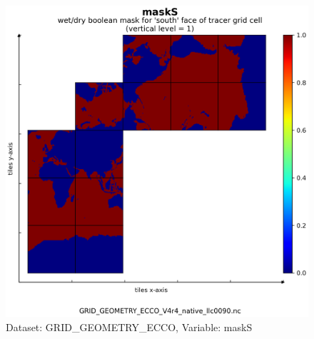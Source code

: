 \begin{figure}[H]
\centering
\includegraphics[scale=0.55]{../images/plots/v4r4/native_plots_coords/Geometry_Parameters_for_the_Lat-Lon-Cap_90_(llc90)_Native_Model_Grid_(Version_4_Release_4)/maskS.png}
\caption{Dataset: GRID\_GEOMETRY\_ECCO, Variable: maskS}
\label{tab:table-GRID_GEOMETRY_ECCO_maskS-Plot}
\end{figure}
\newpage